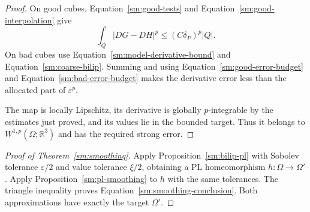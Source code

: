 \documentclass[11pt]{article}
\numberwithin{equation}{section}
\theoremstyle{definition}
\theoremstyle{remark}
\newcommand{\R}{\mathbb R}
\newcommand{\eps}{\varepsilon}
\begin{document}
\begin{proof}
On good cubes, Equation~\eqref{sm:good-tests} and
Equation~\eqref{sm:good-interpolation} give
\[
 \int_Q|DG-DH|^p\le(C\delta_P)^p|Q|.
\]
On bad cubes use
Equation~\eqref{sm:model-derivative-bound} and
Equation~\eqref{sm:coarse-bilip}.  Summing and
using Equation~\eqref{sm:good-error-budget} and
Equation~\eqref{sm:bad-error-budget} makes the
derivative error less than the allocated
part of $\eps^p$.

The map is locally Lipschitz,
its derivative is globally $p$-integrable
by the estimates just proved, and its
values lie in the bounded target.
Thus it belongs to $W^{1,p}(\Omega;\R^3)$
and has the required strong error.
\end{proof}

\begin{proof}[Proof of Theorem~\ref{sm:smoothing}]
Apply Proposition~\ref{sm:bilip-pl} with
Sobolev tolerance $\eps/2$ and value
tolerance $\xi/2$, obtaining a PL
homeomorphism $h:\Omega\to\Omega'$.
Apply Proposition~\ref{sm:pl-smoothing}
to $h$ with the same tolerances.
The triangle inequality proves
Equation~\eqref{sm:smoothing-conclusion}.
Both approximations have exactly the
target $\Omega'$.
\end{proof}

\begingroup
\raggedright


\endgroup
\end{document}
